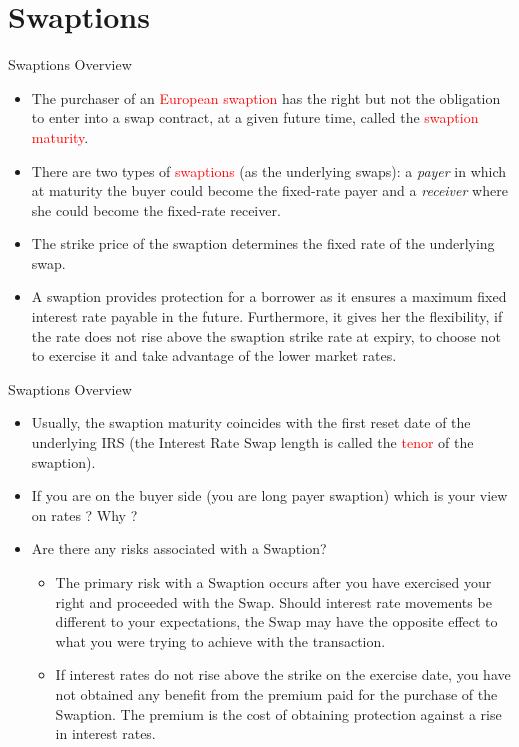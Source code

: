 \documentclass{beamer}
\begin{document}
\section{Swaptions}
\begin{frame}{Swaptions Overview}
\begin{itemize}
	\item<1-> The purchaser of an \textcolor{red}{European swaption} has the right but not the obligation to enter into a swap contract, at a given future time, called the \textcolor{red}{swaption maturity}.
	\item<2-> There are two types of \textcolor{red}{swaptions} (as the underlying swaps): a \emph{payer} in which at maturity the buyer could become the fixed-rate payer and a \emph{receiver} where she could become the fixed-rate receiver.
	\item <3-> The strike price of the swaption determines the fixed rate of the underlying swap.
	\item<4-> A swaption provides protection for a borrower as it ensures a maximum fixed interest rate payable in the future. Furthermore, it gives her the flexibility, if the rate does not rise above the swaption strike rate at expiry, to choose not to exercise it and take advantage of the lower market rates.
\end{itemize}
\end{frame}

\begin{frame}{Swaptions Overview}
	\begin{itemize}
	\item<1-> Usually, the swaption maturity coincides with the first reset date of the underlying IRS (the Interest Rate Swap length is called the \textcolor{red}{tenor} of the swaption).	
	\item<2-> If you are on the buyer side (you are long payer swaption) which is your view on rates ? Why ?
	\item<3-> Are there any risks associated with a Swaption?
	\begin{itemize}
		\item<4-> The primary risk with a Swaption occurs after you have exercised your right and proceeded with the Swap. Should interest rate movements be different to your expectations, the Swap may have the opposite effect to what you were trying to achieve with the transaction. 
		\item<5-> If interest rates do not rise above the strike on the exercise date, you have not obtained any benefit from the premium paid for the purchase of the Swaption. The premium is the cost of obtaining protection against a rise in interest rates.
	\end{itemize}
\end{itemize}
\end{frame}
\end{document}
